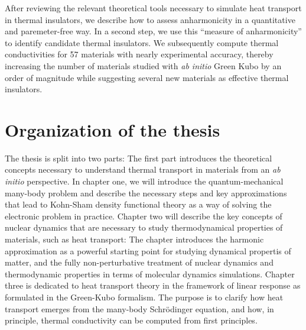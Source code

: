  After reviewing the relevant theoretical tools necessary to simulate heat transport in thermal insulators, we describe how to assess anharmonicity in a quantitative and paremeter-free way. 
In a second step, we use this ``measure of anharmonicity'' to identify candidate thermal insulators. We subsequently compute thermal conductivities for 57 materials with nearly experimental accuracy, thereby increasing the number of materials studied with \emph{ab initio} Green Kubo by an order of magnitude while suggesting several new materials as effective thermal insulators. 


\section*{Organization of the thesis}
The thesis is split into two parts: The first part introduces the theoretical concepts necessary to understand thermal transport in materials from an \emph{ab initio} perspective.
In chapter one, we will introduce the quantum-mechanical many-body problem and describe the necessary steps and key approximations that lead to Kohn-Sham density functional theory as a way of solving the electronic problem in practice. Chapter two will describe the key concepts of nuclear dynamics that are necessary to study thermodynamical properties of materials, such as heat transport: The chapter introduces the harmonic approximation as a powerful starting point for studying dynamical propertis of matter, and the fully non-perturbative treatment of nuclear dynamics and thermodynamic properties in terms of molecular dynamics simulations. Chapter three is dedicated to heat transport theory in the framework of linear response as formulated in the Green-Kubo formalism. The purpose is to clarify how heat transport emerges from the many-body Schr\"odinger equation, and how, in principle, thermal conductivity can be computed from first principles.

